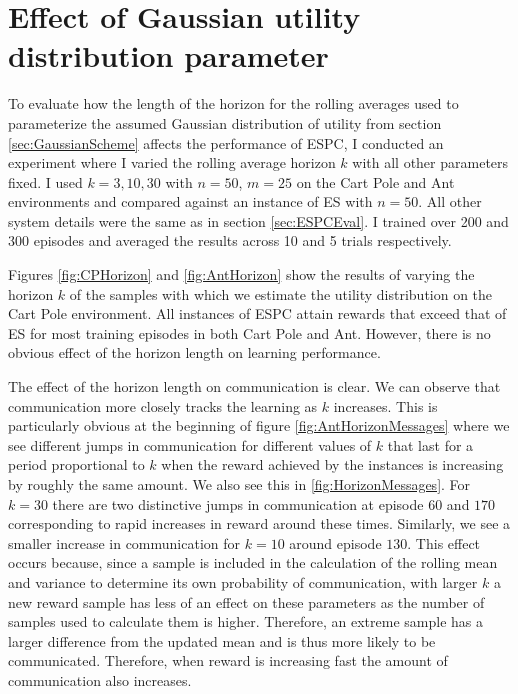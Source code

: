 \section{Effect of Gaussian utility distribution parameter}

To evaluate how the length of the horizon for the rolling averages used to parameterize the assumed Gaussian distribution of utility from section \ref{sec:GaussianScheme} affects the performance of ESPC, I conducted an experiment where I varied the rolling average horizon $k$ with all other parameters fixed. I used $k=3,10,30$ with $n=50$, $m=25$ on the Cart Pole and Ant environments and compared against an instance of ES with $n=50$. All other system details were the same as in section \ref{sec:ESPCEval}. I trained over 200 and 300 episodes and averaged the results across 10 and 5 trials respectively.

Figures \ref{fig:CPHorizon} and \ref{fig:AntHorizon} show the results of varying the horizon $k$ of the samples with which we estimate the utility distribution on the Cart Pole environment. All instances of ESPC attain rewards that exceed that of ES for most training episodes in both Cart Pole and Ant. However, there is no obvious effect of the horizon length on learning performance.

The effect of the horizon length on communication is clear. We can observe that communication more closely tracks the learning as $k$ increases. 
This is particularly obvious at the beginning of figure \ref{fig:AntHorizonMessages} where we see different jumps in communication for different values of $k$ that last for a period proportional to $k$ when the reward achieved by the instances is increasing by roughly the same amount. We also see this in \ref{fig:HorizonMessages}. For $k=30$ there are two distinctive jumps in communication at episode $60$ and $170$ corresponding to rapid increases in reward around these times. Similarly, we see a smaller increase in communication for $k=10$ around episode $130$.
This effect occurs because, since a sample is included in the calculation of the rolling mean and variance to determine its own probability of communication, with larger $k$ a new reward sample has less of an effect on these parameters as the number of samples used to calculate them is higher. Therefore, an extreme sample has a larger difference from the updated mean and is thus more likely to be communicated. Therefore, when reward is increasing fast the amount of communication also increases.

